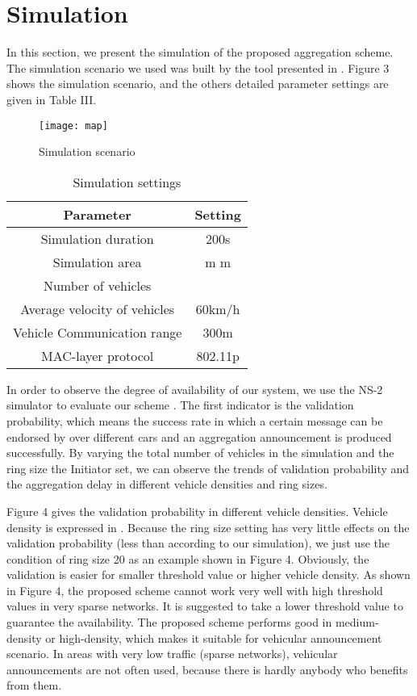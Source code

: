 \documentclass[a4paper]{article}
\begin{document}
\section{Simulation}
In this section, we present the simulation of the proposed aggregation scheme. The simulation scenario we used was built by the tool presented in \cite{KML07}. Figure 3 shows the simulation scenario, and the others detailed parameter settings are given in Table III.

\begin{figure}
  \centering
  \texttt{[image: map]}
  \caption{Simulation scenario}
\end{figure}

\begin{table}
\caption{Simulation settings}
\begin{center}
\begin{tabular}{|c|c|}
  \toprule
Parameter & Setting \\
  \midrule
  Simulation duration & 200s \\
  Simulation area & m m\\
  Number of vehicles &    \\
  Average velocity of vehicles & 60km/h \\
  Vehicle Communication range & 300m \\
  MAC-layer protocol & 802.11p\\
  \bottomrule
\end{tabular}
\end{center}
\end{table}

In order to observe the degree of availability of our system, we use the NS-2 simulator to evaluate our scheme \cite{NS2}. The first indicator is the validation probability, which means the success rate in which a certain message can be endorsed by over  different cars and an aggregation announcement is produced successfully. By varying the total number of vehicles in the simulation and the ring size  the Initiator set, we can observe the trends of validation probability and the aggregation delay in different vehicle densities and ring sizes.

Figure 4 gives the validation probability in different vehicle densities. Vehicle density is expressed in . Because the ring size setting has very little effects on the validation probability (less than  according to our simulation), we just use the condition of ring size 20 as an example shown in Figure 4. Obviously, the validation is easier for smaller threshold value or higher vehicle density.  As shown in Figure 4, the proposed scheme cannot work very well with high threshold values in very sparse networks. It is suggested to take a lower threshold value to guarantee the availability. The proposed scheme performs good in medium-density or high-density, which makes it suitable for vehicular announcement scenario. In areas with very low traffic (sparse networks), vehicular announcements are not often used, because there is hardly anybody who benefits from them.
\end{document}
